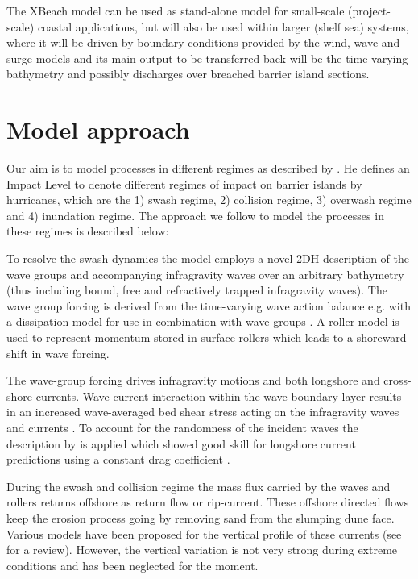 The XBeach model can be used as stand-alone model for small-scale (project-scale) coastal applications, but will also be used within larger (shelf sea) systems, where it will be driven by boundary conditions provided by the wind, wave and surge models and its main output to be transferred back will be the time-varying bathymetry and possibly discharges over breached barrier island sections.

\section{ Model approach}

Our aim is to model processes in different regimes as described by \citet{Sallenger2000}. He  defines an Impact Level to denote different regimes of impact on barrier islands by hurricanes, which are the 1) swash regime, 2) collision regime, 3) overwash regime and 4) inundation regime. The approach we follow to model the processes in these regimes is described below: 

To resolve the swash dynamics the model employs a novel 2DH description of the wave groups and accompanying infragravity waves over an arbitrary bathymetry (thus including bound, free and refractively trapped infragravity waves). The wave group forcing is derived from the time-varying wave action balance e.g. \citet{Phillips1977} with a dissipation model for use in combination with wave groups \citep{Roelvink1993a}. A roller model \citep{Svendsen1984, Nairn1990, Stive1994} is used to represent momentum stored in surface rollers which leads to a shoreward shift in wave forcing. 

The wave-group forcing drives infragravity motions and both longshore and cross-shore currents. Wave-current interaction within the wave boundary layer results in an increased wave-averaged bed shear stress acting on the infragravity waves and currents \citep[e.g.][and references therein]{Soulsby1993}. To account for the randomness of the incident waves the description by \citet{Feddersen2000} is applied which showed good skill for longshore current predictions using a constant drag coefficient \citep{Ruessink2001}. 

During the swash and collision regime the mass flux carried by the waves and rollers returns offshore as return flow or rip-current. These offshore directed flows keep the erosion process going by removing sand from the slumping dune face. Various models have been proposed for the vertical profile of these currents (see \citet{Reniers2004b} for a review). However, the vertical variation is not very strong during extreme conditions and has been neglected for the moment. 

